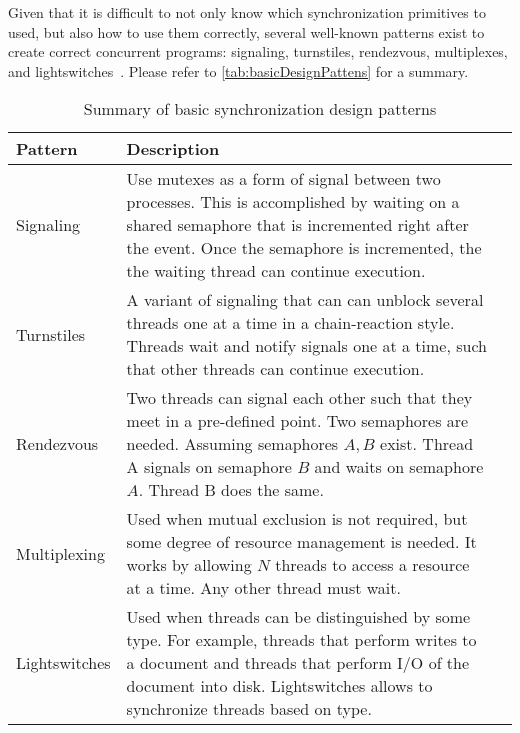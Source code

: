 Given that it is difficult to not only know which synchronization
primitives to used, but also how to use them correctly,
several well-known patterns exist to create
correct concurrent programs: signaling,
turnstiles, rendezvous, multiplexes, and lightswitches~\cite{csf2025synchronizationDesign}.
Please refer to \autoref{tab:basicDesignPattens} for a summary.


\begin{table}[!htb]
    \caption{Summary of basic synchronization design patterns}
    \label{tab:basicDesignPattens}
    \centering
    \begin{tabularx}{\textwidth}{|l|X|X|}
        \hline
        \textbf{Pattern} & \textbf{Description}\\
        \hline
        Signaling & 
        Use mutexes as a form of signal between two processes. This is
        accomplished by waiting on a shared semaphore that is incremented
        right after the event. Once the semaphore is incremented, the
        the waiting thread can continue execution.\\
        \hline
        Turnstiles & 
        A variant of signaling that can can unblock several threads
        one at a time in a chain-reaction style. Threads wait
        and notify signals one at a time, such that other threads
        can continue execution.\\
        \hline
        Rendezvous & 
        Two threads can signal each other such that they meet
        in a pre-defined point. Two semaphores are needed. Assuming
        semaphores $A, B$ exist. Thread A signals on semaphore $B$ and
        waits on semaphore $A$. Thread B does the same.\\
        \hline
        Multiplexing &
        Used when mutual exclusion is not required, but some
        degree of resource management is needed. It works
        by allowing $N$ threads to access a resource at a time.
        Any other thread must wait.\\
        \hline
        Lightswitches &
        Used when threads can be distinguished by some
        type. For example, threads that perform writes to
        a document and threads that perform I/O of the document
        into disk. Lightswitches allows to synchronize
        threads based on type.\\
        \hline
    \end{tabularx}
\end{table}


